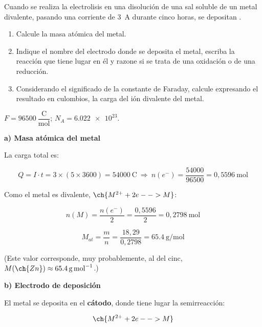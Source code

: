 \begin{exercise}
    Cuando se realiza la electrolisis en una disolución de una sal soluble de un metal divalente, pasando una corriente de \SI{3}{\ampere} durante cinco horas, se depositan .
    \begin{enumerate}[label=\letraminuscula]
        \item Calcule la masa atómica del metal.
        \item Indique el nombre del electrodo donde se deposita el metal, escriba la reacción que tiene lugar en él y razone si se trata de una oxidación o de una reducción.
        \item Considerando el significado de la constante de Faraday, calcule expresando el resultado en culombios, la carga del ión divalente del metal.
    \end{enumerate}
    \datos{} \(F = \num{96500}\ \dfrac{\text{C}}{\text{mol}}\); \(N_A = \num{6.022e23}\).
    \begin{solu}

        \textbf{a) Masa atómica del metal}

        La carga total es:

        \begin{equation*}
            Q = I \cdot t = 3 \times (5 \times 3600) = \SI{54000}{\coulomb} \ \Rightarrow \ n(e^-) = \dfrac{54000}{96500} = 0,5596 \ \text{mol}
        \end{equation*}

        Como el metal es divalente, \(\ch{M^{2+} + 2 e- -> M}\):

        \begin{equation*}
            n(M) = \dfrac{n(e^-)}{2} = \dfrac{0,5596}{2} = 0,2798 \ \text{mol}
        \end{equation*}

        \begin{equation*}
            M_{at} = \dfrac{m}{n} = \dfrac{18,29}{0,2798} = \SI{65.4}{\gram\per\mole}
        \end{equation*}

        (Este valor corresponde, muy probablemente, al del cinc, \(M(\ch{Zn}) \approx \SI{65.4}{\gram\per\mole}\).)

        \textbf{b) Electrodo de deposición}

        El metal se deposita en el \textbf{cátodo}, donde tiene lugar la semirreacción:

        \begin{equation*}
            \ch{M^{2+} + 2 e- -> M}
        \end{equation*}


\end{solu}
\end{exercise}
